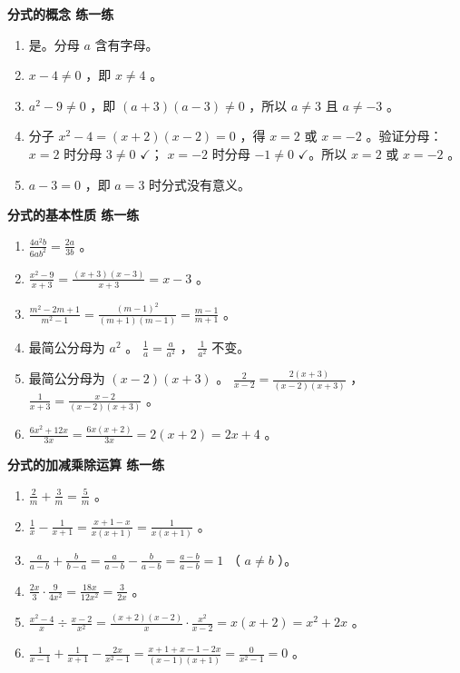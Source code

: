 \begin{answer}


\textbf{分式的概念 练一练}

\begin{enumerate}
  \item 是。分母 $a$ 含有字母。
  \item $x - 4 \neq 0$ ，即 $x \neq 4$ 。
  \item $a^2 - 9 \neq 0$ ，即 $(a+3)(a-3) \neq 0$ ，所以 $a \neq 3$ 且 $a \neq -3$ 。
  \item 分子 $x^2 - 4 = (x+2)(x-2) = 0$ ，得 $x = 2$ 或 $x = -2$ 。验证分母： $x = 2$ 时分母 $3 \neq 0$ $\checkmark$； $x = -2$ 时分母 $-1 \neq 0$ $\checkmark$。所以 $x = 2$ 或 $x = -2$ 。
  \item $a - 3 = 0$ ，即 $a = 3$ 时分式没有意义。
\end{enumerate}


\textbf{分式的基本性质 练一练}

\begin{enumerate}
  \item $\frac{4a^2b}{6ab^2} = \frac{2a}{3b}$ 。
  \item $\frac{x^2 - 9}{x + 3} = \frac{(x+3)(x-3)}{x+3} = x - 3$ 。
  \item $\frac{m^2 - 2m + 1}{m^2 - 1} = \frac{(m-1)^2}{(m+1)(m-1)} = \frac{m-1}{m+1}$ 。
  \item 最简公分母为 $a^2$ 。 $\frac{1}{a} = \frac{a}{a^2}$ ， $\frac{1}{a^2}$ 不变。
  \item 最简公分母为 $(x-2)(x+3)$ 。 $\frac{2}{x-2} = \frac{2(x+3)}{(x-2)(x+3)}$ ， $\frac{1}{x+3} = \frac{x-2}{(x-2)(x+3)}$ 。
  \item $\frac{6x^2 + 12x}{3x} = \frac{6x(x + 2)}{3x} = 2(x + 2) = 2x + 4$ 。
\end{enumerate}


\textbf{分式的加减乘除运算 练一练}

\begin{enumerate}
  \item $\frac{2}{m} + \frac{3}{m} = \frac{5}{m}$ 。
  \item $\frac{1}{x} - \frac{1}{x+1} = \frac{x + 1 - x}{x(x+1)} = \frac{1}{x(x+1)}$ 。
  \item $\frac{a}{a-b} + \frac{b}{b-a} = \frac{a}{a-b} - \frac{b}{a-b} = \frac{a-b}{a-b} = 1$ （ $a \neq b$ ）。
  \item $\frac{2x}{3} \cdot \frac{9}{4x^2} = \frac{18x}{12x^2} = \frac{3}{2x}$ 。
  \item $\frac{x^2 - 4}{x} \div \frac{x - 2}{x^2} = \frac{(x+2)(x-2)}{x} \cdot \frac{x^2}{x-2} = x(x + 2) = x^2 + 2x$ 。
  \item $\frac{1}{x-1} + \frac{1}{x+1} - \frac{2x}{x^2-1} = \frac{x+1+x-1-2x}{(x-1)(x+1)} = \frac{0}{x^2-1} = 0$ 。
\end{enumerate}



\end{answer}
